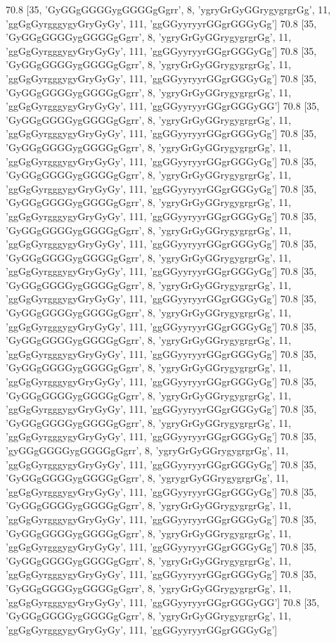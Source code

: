 70.8 [35, 'GyGGgGGGGygGGGGgGgrr', 8, 'ygryGrGyGGrygygrgrGg', 11, 'ggGgGyrgggygyGryGyGy', 111, 'ggGGyyryyrGGgrGGGyGg']
70.8 [35, 'GyGGgGGGGygGGGGgGgrr', 8, 'ygryGrGyGGrygygrgrGg', 11, 'ggGgGyrgggygyGryGyGy', 111, 'ggGGyyryyrGGgrGGGyGg']
70.8 [35, 'GyGGgGGGGygGGGGgGgrr', 8, 'ygryGrGyGGrygygrgrGg', 11, 'ggGgGyrgggygyGryGyGy', 111, 'ggGGyyryyrGGgrGGGyGg']
70.8 [35, 'GyGGgGGGGygGGGGgGgrr', 8, 'ygryGrGyGGrygygrgrGg', 11, 'ggGgGyrgggygyGryGyGy', 111, 'ggGGyyryyrGGgrGGGyGG']
70.8 [35, 'GyGGgGGGGygGGGGgGgrr', 8, 'ygryGrGyGGrygygrgrGg', 11, 'ggGgGyrgggygyGryGyGy', 111, 'ggGGyyryyrGGgrGGGyGg']
70.8 [35, 'GyGGgGGGGygGGGGgGgrr', 8, 'ygryGrGyGGrygygrgrGg', 11, 'ggGgGyrgggygyGryGyGy', 111, 'ggGGyyryyrGGgrGGGyGg']
70.8 [35, 'GyGGgGGGGygGGGGgGgrr', 8, 'ygryGrGyGGrygygrgrGg', 11, 'ggGgGyrgggygyGryGyGy', 111, 'ggGGyyryyrGGgrGGGyGg']
70.8 [35, 'GyGGgGGGGygGGGGgGgrr', 8, 'ygryGrGyGGrygygrgrGg', 11, 'ggGgGyrgggygyGryGyGy', 111, 'ggGGyyryyrGGgrGGGyGg']
70.8 [35, 'GyGGgGGGGygGGGGgGgrr', 8, 'ygryGrGyGGrygygrgrGg', 11, 'ggGgGyrgggygyGryGyGy', 111, 'ggGGyyryyrGGgrGGGyGg']
70.8 [35, 'GyGGgGGGGygGGGGgGgrr', 8, 'ygryGrGyGGrygygrgrGg', 11, 'ggGgGyrgggygyGryGyGy', 111, 'ggGGyyryyrGGgrGGGyGg']
70.8 [35, 'GyGGgGGGGygGGGGgGgrr', 8, 'ygryGrGyGGrygygrgrGg', 11, 'ggGgGyrgggygyGryGyGy', 111, 'ggGGyyryyrGGgrGGGyGg']
70.8 [35, 'GyGGgGGGGygGGGGgGgrr', 8, 'ygryGrGyGGrygygrgrGg', 11, 'ggGgGyrgggygyGryGyGy', 111, 'ggGGyyryyrGGgrGGGyGg']
70.8 [35, 'GyGGgGGGGygGGGGgGgrr', 8, 'ygryGrGyGGrygygrgrGg', 11, 'ggGgGyrgggygyGryGyGy', 111, 'ggGGyyryyrGGgrGGGyGg']
70.8 [35, 'GyGGgGGGGygGGGGgGgrr', 8, 'ygryGrGyGGrygygrgrGg', 11, 'ggGgGyrgggygyGryGyGy', 111, 'ggGGyyryyrGGgrGGGyGg']
70.8 [35, 'GyGGgGGGGygGGGGgGgrr', 8, 'ygryGrGyGGrygygrgrGg', 11, 'ggGgGyrgggygyGryGyGy', 111, 'ggGGyyryyrGGgrGGGyGg']
70.8 [35, 'GyGGgGGGGygGGGGgGgrr', 8, 'ygryGrGyGGrygygrgrGg', 11, 'ggGgGyrgggygyGryGyGy', 111, 'ggGGyyryyrGGgrGGGyGg']
70.8 [35, 'gyGGgGGGGygGGGGgGgrr', 8, 'ygryGrGyGGrygygrgrGg', 11, 'ggGgGyrgggygyGryGyGy', 111, 'ggGGyyryyrGGgrGGGyGg']
70.8 [35, 'GyGGgGGGGygGGGGgGgrr', 8, 'ygrygrGyGGrygygrgrGg', 11, 'ggGgGyrgggygyGryGyGy', 111, 'ggGGyyryyrGGgrGGGyGg']
70.8 [35, 'GyGGgGGGGygGGGGgGgrr', 8, 'ygryGrGyGGrygygrgrGg', 11, 'ggGgGyrgggygyGryGyGy', 111, 'ggGGyyryyrGGgrGGGyGg']
70.8 [35, 'GyGGgGGGGygGGGGgGgrr', 8, 'ygryGrGyGGrygygrgrGg', 11, 'ggGgGyrgggygyGryGyGy', 111, 'ggGGyyryyrGGgrGGGyGg']
70.8 [35, 'GyGGgGGGGygGGGGgGgrr', 8, 'ygryGrGyGGrygygrgrGg', 11, 'ggGgGyrgggygyGryGyGy', 111, 'ggGGyyryyrGGgrGGGyGg']
70.8 [35, 'GyGGgGGGGygGGGGgGgrr', 8, 'ygryGrGyGGrygygrgrGg', 11, 'ggGgGyrgggygyGryGyGy', 111, 'ggGGyyryyrGGgrGGGyGG']
70.8 [35, 'GyGGgGGGGygGGGGgGgrr', 8, 'ygryGrGyGGrygygrgrGg', 11, 'ggGgGyrgggygyGryGyGy', 111, 'ggGGyyryyrGGgrGGGyGg']
